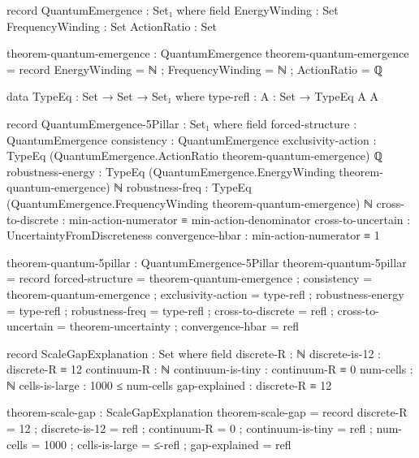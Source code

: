 \documentclass[11pt,a4paper]{book}
\begin{document}
\begin{code}
record QuantumEmergence : Set₁ where
  field
    EnergyWinding    : Set
    FrequencyWinding : Set
    ActionRatio      : Set

theorem-quantum-emergence : QuantumEmergence
theorem-quantum-emergence = record
  { EnergyWinding    = ℕ
  ; FrequencyWinding = ℕ
  ; ActionRatio      = ℚ
  }

data TypeEq : Set → Set → Set₁ where
  type-refl : {A : Set} → TypeEq A A

record QuantumEmergence-5Pillar : Set₁ where
  field
    forced-structure    : QuantumEmergence
    consistency         : QuantumEmergence
    exclusivity-action  : TypeEq (QuantumEmergence.ActionRatio theorem-quantum-emergence) ℚ
    robustness-energy   : TypeEq (QuantumEmergence.EnergyWinding theorem-quantum-emergence) ℕ
    robustness-freq     : TypeEq (QuantumEmergence.FrequencyWinding theorem-quantum-emergence) ℕ
    cross-to-discrete   : min-action-numerator ≡ min-action-denominator
    cross-to-uncertain  : UncertaintyFromDiscreteness
    convergence-hbar    : min-action-numerator ≡ 1

theorem-quantum-5pillar : QuantumEmergence-5Pillar
theorem-quantum-5pillar = record
  { forced-structure    = theorem-quantum-emergence
  ; consistency         = theorem-quantum-emergence
  ; exclusivity-action  = type-refl
  ; robustness-energy   = type-refl
  ; robustness-freq     = type-refl
  ; cross-to-discrete   = refl
  ; cross-to-uncertain  = theorem-uncertainty
  ; convergence-hbar    = refl
  }
\end{code}

\begin{code}
record ScaleGapExplanation : Set where
  field
    discrete-R : ℕ
    discrete-is-12 : discrete-R ≡ 12
    continuum-R : ℕ
    continuum-is-tiny : continuum-R ≡ 0
    num-cells : ℕ
    cells-is-large : 1000 ≤ num-cells
    gap-explained : discrete-R ≡ 12

theorem-scale-gap : ScaleGapExplanation
theorem-scale-gap = record
  { discrete-R = 12
  ; discrete-is-12 = refl
  ; continuum-R = 0
  ; continuum-is-tiny = refl
  ; num-cells = 1000
  ; cells-is-large = ≤-refl
  ; gap-explained = refl
  }

\end{code}
\end{document}
